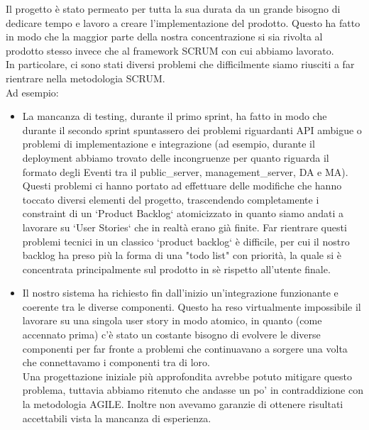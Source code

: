 \documentclass{article}
\begin{document}
Il progetto è stato permeato per tutta la sua durata da un grande bisogno di dedicare tempo e lavoro a creare l'implementazione del prodotto. Questo ha fatto in modo che la maggior parte della nostra concentrazione si sia rivolta al prodotto stesso invece che al framework SCRUM con cui abbiamo lavorato.\\
In particolare, ci sono stati diversi problemi che difficilmente siamo riusciti a far rientrare nella metodologia SCRUM.\\
Ad esempio:
\begin{itemize}
    \item La mancanza di testing, durante il primo sprint, ha fatto in modo che durante il secondo sprint spuntassero dei problemi riguardanti API ambigue o problemi di implementazione e integrazione (ad esempio, durante il deployment abbiamo trovato delle incongruenze per quanto riguarda il formato degli Eventi tra il public\_server, management\_server, DA e MA). Questi problemi ci hanno portato ad effettuare delle modifiche che hanno toccato diversi elementi del progetto, trascendendo completamente i constraint di un `Product Backlog` atomicizzato in quanto siamo andati a lavorare su `User Stories` che in realtà erano già finite. Far rientrare questi problemi tecnici in un classico `product backlog` è difficile, per cui il nostro backlog ha preso più la forma di una "todo list" con priorità, la quale si è concentrata principalmente sul prodotto in sè rispetto all'utente finale. 
    \item Il nostro sistema ha richiesto fin dall'inizio un'integrazione funzionante e coerente tra le diverse componenti. Questo ha reso virtualmente impossibile il lavorare su una singola user story in modo atomico, in quanto (come accennato prima) c'è stato un costante bisogno di evolvere le diverse componenti per far fronte a problemi che continuavano a sorgere una volta che connettavamo i componenti tra di loro.\\
    Una progettazione iniziale più approfondita avrebbe potuto mitigare questo problema, tuttavia abbiamo ritenuto che andasse un po' in contraddizione con la metodologia AGILE. Inoltre non avevamo garanzie di ottenere risultati accettabili vista la mancanza di esperienza.
\end{itemize}
\end{document}
